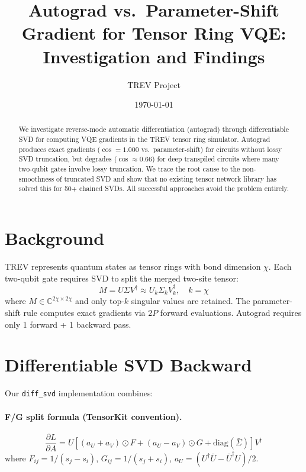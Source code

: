 \documentclass[11pt]{article}
\title{Autograd vs.\ Parameter-Shift Gradient for Tensor Ring VQE:\\
Investigation and Findings}
\author{TREV Project}
\date{\today}
\begin{document}
\maketitle

\begin{abstract}
We investigate reverse-mode automatic differentiation (autograd) through differentiable SVD for computing VQE gradients in the TREV tensor ring simulator. Autograd produces exact gradients ($\cos = 1.000$ vs.\ parameter-shift) for circuits without lossy SVD truncation, but degrades ($\cos \approx 0.66$) for deep transpiled circuits where many two-qubit gates involve lossy truncation. We trace the root cause to the non-smoothness of truncated SVD and show that no existing tensor network library has solved this for 50+ chained SVDs. All successful approaches avoid the problem entirely.
\end{abstract}

\section{Background}

TREV represents quantum states as tensor rings with bond dimension $\chi$. Each two-qubit gate requires SVD to split the merged two-site tensor:
\begin{equation}
M = U \Sigma V^\dagger \approx U_k \Sigma_k V_k^\dagger, \quad k = \chi
\end{equation}
where $M \in \mathbb{C}^{2\chi \times 2\chi}$ and only top-$k$ singular values are retained. The parameter-shift rule computes exact gradients via $2P$ forward evaluations. Autograd requires only 1 forward + 1 backward pass.

\section{Differentiable SVD Backward}

Our \texttt{diff\_svd} implementation combines:

\paragraph{F/G split formula (TensorKit convention).}
\begin{equation}
\frac{\partial L}{\partial A} = U \left[ (a_{U} + a_{V}) \odot F + (a_{U} - a_{V}) \odot G + \mathrm{diag}(\bar{\Sigma}) \right] V^\dagger
\end{equation}
where $F_{ij} = 1/(s_j - s_i)$, $G_{ij} = 1/(s_j + s_i)$, $a_U = (U^\dagger \bar{U} - \bar{U}^\dagger U)/2$.
\end{document}
